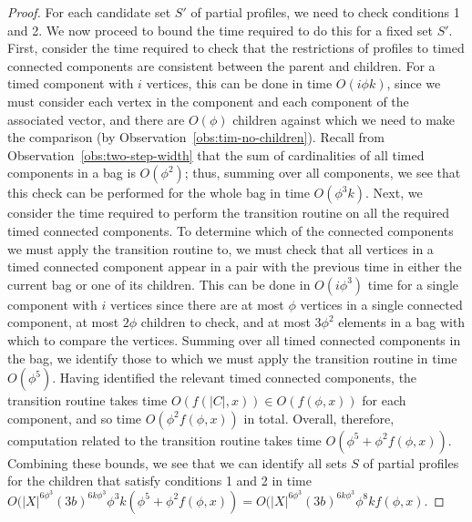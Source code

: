\documentclass[a4paper,UKenglish,cleveref, autoref, thm-restate]{lipics-v2021} %
\begin{document}
\begin{proof}
    For each candidate set $S'$ of partial profiles, we need to check conditions 1 and 2.  We now proceed to bound the time required to do this for a fixed set $S'$.  First, consider the time required to check that the restrictions of profiles to timed connected components are consistent between the parent and children.  For a timed component with $i$ vertices, this can be done in time $O(i\phi k)$, since we must consider each vertex in the component and each component of the associated vector, and there are $O(\phi)$ children against which we need to make the comparison (by Observation~\ref{obs:tim-no-children}).  Recall from Observation~\ref{obs:two-step-width} that the sum of cardinalities of all timed components in a bag is $O(\phi^2)$; thus, summing over all components, we see that this check can be performed for the whole bag in time $O(\phi^3k)$.  Next, we consider the time required to perform the transition routine on all the required timed connected components. To determine which of the connected components we must apply the transition routine to, we must check that all vertices in a timed connected component appear in a pair with the previous time in either the current bag or one of its children. This can be done in $O(i\phi^3)$ time for a single component with $i$ vertices since there are at most $\phi$ vertices in a single connected component, at most $2\phi$ children to check, and at most $3\phi^2$ elements in a bag with which to compare the vertices. Summing over all timed connected components in the bag, we identify those to which we must apply the transition routine in time $O(\phi^5)$.  Having identified the relevant timed connected components, the transition routine takes time $O(f(|C|,x))\in O(f(\phi,x))$ for each component, and so time $O(\phi^2 f(\phi,x))$ in total.  Overall, therefore, computation related to the transition routine takes time $O(\phi^5 + \phi^2 f(\phi,x))$.  Combining these bounds, we see that we can identify all sets $S$ of partial profiles for the children that satisfy conditions 1 and 2 in time $O(|X|^{6 \phi^3}(3b)^{6k\phi^3} \phi^3k(\phi^5 + \phi^2 f(\phi,x)) = O(|X|^{6 \phi^3} (3b)^{6k \phi^3} \phi^8 k f(\phi,x)$.


\end{proof}
\end{document}
